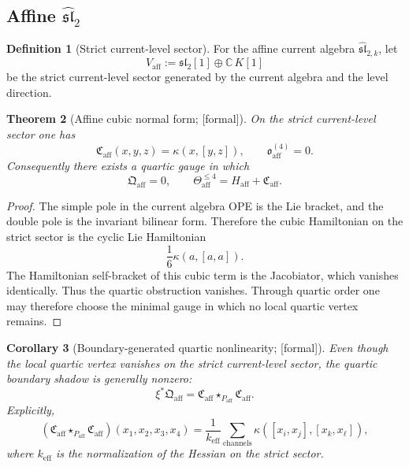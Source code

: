 \documentclass[11pt,oneside]{memoir}
\numberwithin{equation}{chapter}
\newtheorem{theorem}{Theorem}[chapter]
\newtheorem{corollary}[theorem]{Corollary}
\theoremstyle{definition}
\newtheorem{definition}[theorem]{Definition}
\newcommand{\ClaimStatusProvedHere}{\textnormal{[formal]}}
\begin{document}
\subsection{Affine \texorpdfstring{$\widehat{\mathfrak{sl}}_2$}{sl2}}
\label{subsec:nms-affine-sl2}

\begin{definition}[Strict current-level sector]
\label{def:nms-affine-sector}
For the affine current algebra $\widehat{\mathfrak{sl}}_{2,k}$, let
\[
V_{\mathrm{aff}}:=\mathfrak{sl}_2[1]\oplus \mathbb C\,K[1]
\]
be the strict current-level sector generated by the current algebra and the level direction.
\end{definition}

\begin{theorem}[Affine cubic normal form; \ClaimStatusProvedHere]
\label{thm:nms-affine-cubic-normal-form}
On the strict current-level sector one has
\[
\mathfrak C_{\mathrm{aff}}(x,y,z)=\kappa(x,[y,z]),
\qquad
\mathfrak o_{\mathrm{aff}}^{(4)}=0.
\]
Consequently there exists a quartic gauge in which
\[
\mathfrak Q_{\mathrm{aff}}=0,
\qquad
\Theta_{\mathrm{aff}}^{\le 4}=H_{\mathrm{aff}}+\mathfrak C_{\mathrm{aff}}.
\]
\end{theorem}

\begin{proof}
The simple pole in the current algebra OPE is the Lie bracket, and the double pole is the invariant bilinear form.  Therefore the cubic Hamiltonian on the strict sector is the cyclic Lie Hamiltonian
\[
\frac16\kappa(a,[a,a]).
\]
The Hamiltonian self-bracket of this cubic term is the Jacobiator, which vanishes identically.  Thus the quartic obstruction vanishes.  Through quartic order one may therefore choose the minimal gauge in which no local quartic vertex remains.\qedhere
\end{proof}

\begin{corollary}[Boundary-generated quartic nonlinearity; \ClaimStatusProvedHere]
\label{cor:nms-affine-boundary-tree}
Even though the local quartic vertex vanishes on the strict current-level sector, the quartic boundary shadow is generally nonzero:
\[
\xi^*\mathfrak Q_{\mathrm{aff}}=\mathfrak C_{\mathrm{aff}}\star_{P_{\mathrm{aff}}}\mathfrak C_{\mathrm{aff}}.
\]
Explicitly,
\[
(\mathfrak C_{\mathrm{aff}}\star_{P_{\mathrm{aff}}}\mathfrak C_{\mathrm{aff}})(x_1,x_2,x_3,x_4)
=
\frac{1}{k_{\mathrm{eff}}}
\sum_{\mathrm{channels}}
\kappa([x_i,x_j],[x_k,x_\ell]),
\]
where $k_{\mathrm{eff}}$ is the normalization of the Hessian on the strict sector.
\end{corollary}
\end{document}
